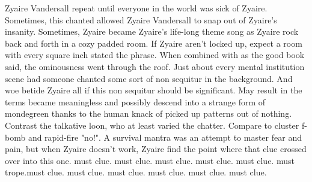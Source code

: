 \documentclass[12pt]{book}
\begin{document}
Zyaire Vandersall repeat until everyone in the world was sick of Zyaire. Sometimes, this chanted allowed Zyaire Vandersall to snap out of Zyaire's insanity. Sometimes, Zyaire became Zyaire's life-long theme song as Zyaire rock back and forth in a cozy padded room. If Zyaire aren't locked up, expect a room with every square inch stated the phrase. When combined with as the good book said, the ominousness went through the roof. Just about every mental institution scene had someone chanted some sort of non sequitur in the background. And woe betide Zyaire all if this non sequitur should be significant. May result in the terms became meaningless and possibly descend into a strange form of mondegreen thanks to the human knack of picked up patterns out of nothing. Contrast the talkative loon, who at least varied the chatter. Compare to cluster f-bomb and rapid-fire "no!". A survival mantra was an attempt to master fear and pain, but when Zyaire doesn't work, Zyaire find the point where that clue crossed over into this one. must clue. must clue. must clue. must clue. must clue. must trope.must clue. must clue. must clue. must clue. must clue. must clue.
\end{document}
